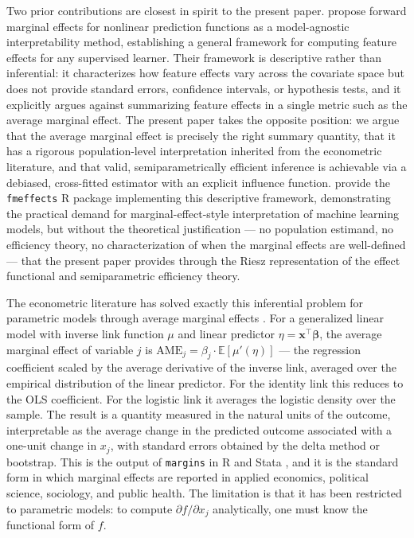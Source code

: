 \documentclass[12pt]{article}
\begin{document}
	Two prior contributions are closest in spirit to the present paper.
	\citet{scholbeck2024fme} propose forward marginal effects for nonlinear prediction
	functions as a model-agnostic interpretability method, establishing a general
	framework for computing feature effects for any supervised learner. Their framework
	is descriptive rather than inferential: it characterizes how feature effects vary
	across the covariate space but does not provide standard errors, confidence intervals,
	or hypothesis tests, and it explicitly argues against summarizing feature effects in
	a single metric such as the average marginal effect. The present paper takes the
	opposite position: we argue that the average marginal effect is precisely the right
	summary quantity, that it has a rigorous population-level interpretation inherited
	from the econometric literature, and that valid, semiparametrically efficient
	inference is achievable via a debiased, cross-fitted estimator with an explicit
	influence function. \cite{lowe2024fmeffects}
	provide the \texttt{fmeffects} R package implementing this descriptive framework,
	demonstrating the practical demand for marginal-effect-style interpretation of
	machine learning models, but without the theoretical justification --- no population estimand, no
	efficiency theory, no characterization of when the marginal effects are
	well-defined --- that the present paper provides through the Riesz representation
	of the effect functional and semiparametric efficiency theory.
	
	The econometric literature has solved exactly this inferential problem for parametric
	models through average marginal effects \citep{greene2012, wooldridge2010}. For a
	generalized linear model with inverse link function $\mu$ and linear predictor
	$\eta = \mathbf{x}^\top \boldsymbol{\beta}$, the average marginal effect of variable
	$j$ is $\mathrm{AME}_j = \beta_j \cdot \mathbb{E}[\mu'(\eta)]$ --- the regression
	coefficient scaled by the average derivative of the inverse link, averaged over the
	empirical distribution of the linear predictor. For the identity link this reduces
	to the OLS coefficient. For the logistic link it averages the logistic density over
	the sample. The result is a quantity measured in the natural units of the outcome,
	interpretable as the average change in the predicted outcome associated with a
	one-unit change in $x_j$, with standard errors obtained by the delta method or
	bootstrap. This is the output of \texttt{margins} in R and Stata \citep{leeper2021},
	and it is the standard form in which marginal effects are reported in applied
	economics, political science, sociology, and public health. The limitation is that
	it has been restricted to parametric models: to compute $\partial f / \partial x_j$
	analytically, one must know the functional form of $f$.
	
\end{document}
